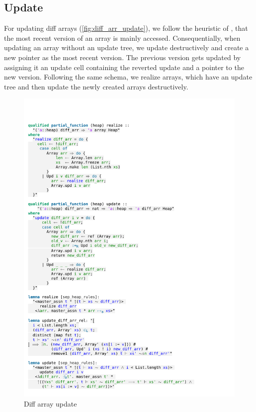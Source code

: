 \subsection{Update}

For updating diff arrays (\autoref{fig:diff_arr_update}), we follow the heuristic of \cite[p.27]{Bloss1989}, that the most recent version of an array is mainly accessed. Consequentially, when updating an array without an update tree, we update destructively and create a new pointer as the most recent version. The previous version gets updated by assigning it an update cell containing the reverted update and a pointer to the new version. Following the same schema, we realize arrays, which have an update tree and then update the newly created arrays destructively.

\begin{figure}[htpb]
    \includegraphics[trim={0 10,6cm 0 10,2cm}, clip, width=1.00\textwidth]{figures/Theory_Diff_Arr_Update.pdf}
    \caption[Diff array update]{Diff array update}
    \label{fig:diff_arr_update}
\end{figure}

